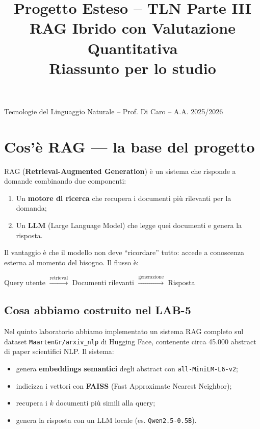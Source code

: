 \documentclass[12pt,a4paper]{article}
\title{\textbf{Progetto Esteso -- TLN Parte III}\\[0.3em]
\large RAG Ibrido con Valutazione Quantitativa\\[0.2em]
\normalsize Riassunto per lo studio}
\author{}
\date{}
\begin{document}
\maketitle
\vspace{-2em}
\begin{center}
Tecnologie del Linguaggio Naturale -- Prof. Di Caro -- A.A. 2025/2026
\end{center}

\tableofcontents

\section{Cos'\`e RAG --- la base del progetto}

RAG (\textbf{Retrieval-Augmented Generation}) \`e un sistema che risponde a domande combinando due componenti:

\begin{enumerate}
  \item Un \textbf{motore di ricerca} che recupera i documenti pi\`u rilevanti per la domanda;
  \item Un \textbf{LLM} (Large Language Model) che legge quei documenti e genera la risposta.
\end{enumerate}

Il vantaggio \`e che il modello non deve ``ricordare'' tutto: accede a conoscenza esterna al momento del bisogno. Il flusso \`e:

\begin{center}
Query utente $\xrightarrow{\text{retrieval}}$ Documenti rilevanti $\xrightarrow{\text{generazione}}$ Risposta
\end{center}

\subsection{Cosa abbiamo costruito nel LAB-5}

Nel quinto laboratorio abbiamo implementato un sistema RAG completo sul dataset \texttt{MaartenGr/arxiv\_nlp} di Hugging Face, contenente circa 45.000 abstract di paper scientifici NLP. Il sistema:

\begin{itemize}
  \item genera \textbf{embeddings semantici} degli abstract con \texttt{all-MiniLM-L6-v2};
  \item indicizza i vettori con \textbf{FAISS} (Fast Approximate Nearest Neighbor);
  \item recupera i $k$ documenti pi\`u simili alla query;
  \item genera la risposta con un LLM locale (es. \texttt{Qwen2.5-0.5B}).
\end{itemize}
\end{document}
